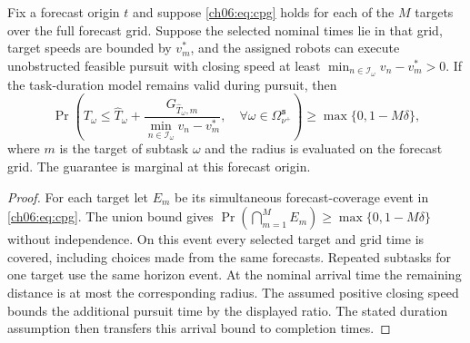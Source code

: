 \begin{revision}
\begin{lemma}
\label{ch06:lemma:key-bound}
Fix a forecast origin $t$ and suppose \eqref{ch06:eq:cpg} holds for each
of the $M$ targets over the full forecast grid. Suppose the selected nominal
times lie in that grid, target speeds are bounded by $v_m^\ast$, and the
assigned robots can execute unobstructed feasible pursuit with closing speed
at least $\min_{n\in\mathcal I_\omega}v_n-v_m^\ast>0$.
If the task-duration model remains valid during pursuit, then
\begin{equation}
\label{ch06:eq:key-bound}
\Pr\left(
T_\omega\le\widehat T_\omega+
\frac{G_{\widehat T_\omega,m}}
{\min_{n\in\mathcal I_\omega}v_n-v_m^\ast},\quad
\forall\omega\in\Omega_{\nu^+}^{\texttt s}
\right)\ge\max\{0,1-M\delta\},
\end{equation}
where $m$ is the target of subtask $\omega$ and the radius is evaluated on
the forecast grid. The guarantee is marginal at this forecast origin.
\end{lemma}
\begin{proof}
For each target let $E_m$ be its simultaneous forecast-coverage event in
\eqref{ch06:eq:cpg}. The union bound gives
$\Pr(\bigcap_{m=1}^M E_m)\ge\max\{0,1-M\delta\}$ without independence.
On this event every selected target and grid time is covered, including
choices made from the same forecasts. Repeated subtasks for one target use
the same horizon event. At the nominal arrival time the remaining distance
is at most the corresponding radius. The assumed positive closing speed
bounds the additional pursuit time by the displayed ratio. The stated
duration assumption then transfers this arrival bound to completion times.
\end{proof}
\end{revision}

